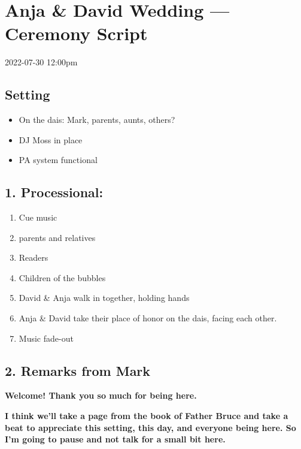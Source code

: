 \LARGE
\hypertarget{section}{%
\section{Anja \& David Wedding --- Ceremony Script}\label{section}}

2022-07-30 12:00pm

\hypertarget{setting}{%
\subsection{Setting}\label{setting}}

\begin{itemize}
\tightlist
\item
  On the dais: Mark, parents, aunts, others?
\item
  DJ Moss in place
\item
  PA system functional
\end{itemize}

\hypertarget{processional}{%
\subsection{1. Processional:}\label{processional}}

\begin{enumerate}
\def\labelenumi{\arabic{enumi}.}
\tightlist
\item
  Cue music
\item
  parents and relatives
\item
  Readers
\item
  Children of the bubbles
\item
  David \& Anja walk in together, holding hands
\item
  Anja \& David take their place of honor on the dais, facing each
  other.
\item
  Music fade-out
\end{enumerate}

\hypertarget{remarks-from-mark}{%
\subsection{2. Remarks from Mark}\label{remarks-from-mark}}

\textbf{Welcome! Thank you so much for being here.}

\textbf{I think we'll take a page from the book of Father Bruce and take
a beat to appreciate this setting, this day, and everyone being here. So
I'm going to pause and not talk for a small bit here.}


